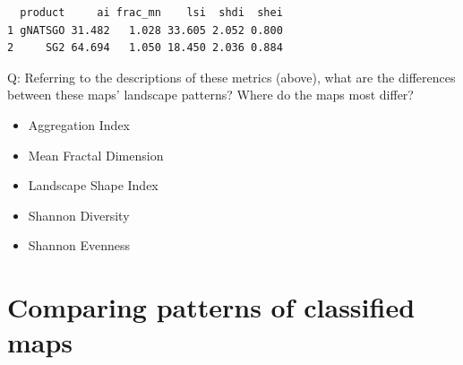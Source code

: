 \documentclass[
  letterpaper,
  DIV=11,
  numbers=noendperiod]{scrartcl}
\newenvironment{Shaded}{\begin{snugshade}}{\end{snugshade}}
\newcommand{\AttributeTok}[1]{\textcolor[rgb]{0.40,0.45,0.13}{#1}}
\newcommand{\DecValTok}[1]{\textcolor[rgb]{0.68,0.00,0.00}{#1}}
\newcommand{\FunctionTok}[1]{\textcolor[rgb]{0.28,0.35,0.67}{#1}}
\newcommand{\NormalTok}[1]{\textcolor[rgb]{0.00,0.23,0.31}{#1}}
\newcommand{\OtherTok}[1]{\textcolor[rgb]{0.00,0.23,0.31}{#1}}
\newcommand{\SpecialCharTok}[1]{\textcolor[rgb]{0.37,0.37,0.37}{#1}}
\newcommand{\StringTok}[1]{\textcolor[rgb]{0.13,0.47,0.30}{#1}}
\providecommand{\tightlist}{%
  \setlength{\itemsep}{0pt}\setlength{\parskip}{0pt}}\usepackage{longtable,booktabs,array}
\begin{document}
\begin{Shaded}
\end{Shaded}

\begin{verbatim}
  product     ai frac_mn    lsi  shdi  shei
1 gNATSGO 31.482   1.028 33.605 2.052 0.800
2     SG2 64.694   1.050 18.450 2.036 0.884
\end{verbatim}

Q: Referring to the descriptions of these metrics (above), what are the
differences between these maps' landscape patterns? Where do the maps
most differ?

\begin{itemize}
\tightlist
\item
  Aggregation Index
\item
  Mean Fractal Dimension
\item
  Landscape Shape Index
\item
  Shannon Diversity
\item
  Shannon Evenness
\end{itemize}

\hypertarget{sec-compare-classified}{%
\section{Comparing patterns of classified
maps}\label{sec-compare-classified}}
\end{document}
